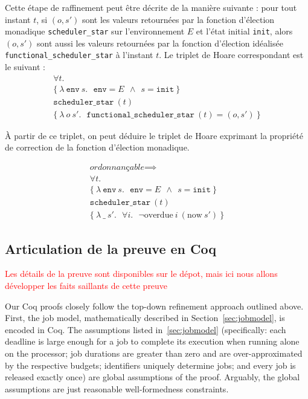 	Cette étape de raffinement peut être décrite de la manière suivante : pour tout instant $t$, si $(o, s')$ sont les valeurs retournées par la fonction d'élection monadique \texttt{scheduler\_star} sur l'environnement $E$ et l'état initial \texttt{init}, alors $(o, s')$ sont aussi les valeurs retournées par la fonction d'élection idéalisée \texttt{functional\_scheduler\_star} à l'instant $t$. Le triplet de Hoare correspondant est le suivant :
	\begin{gather*}
		\forall t.\\
		\{
		~\lambda~\mathtt{env}~s.~~~\mathtt{env} = E~~\land~~s = \mathtt{init}~
		\}\\
		\texttt{scheduler\_star}~(t)\\
		\{
		~\lambda~o~s'.~~~\texttt{functional\_scheduler\_star}~(t) = (o,s')~
		\}
	\end{gather*}

	À partir de ce triplet, on peut déduire le triplet de Hoare exprimant la propriété de correction de la fonction d'élection monadique.

	\begin{gather*}
		\textit{ordonnançable} \implies\\
		\forall t.\\
		\{
		~\lambda~\mathtt{env}~s.~~~\mathtt{env} = E~~\land~~s = \mathtt{init}~
		\}\\
		\texttt{scheduler\_star}~(t)\\
		\{
		~\lambda~\_~s'.~~~\forall i.~~~\neg \text{overdue}~i~(\text{now}~s') ~
		\}
	\end{gather*}


	\subsection{Articulation de la preuve en Coq}

	\textcolor{red}{Les détails de la preuve sont disponibles sur le dépot, mais ici nous allons développer les faits saillants de cette preuve}

	Our Coq proofs closely follow the top-down refinement approach outlined above. First, the job model, mathematically described in Section~\ref{sec:jobmodel}, is encoded in Coq. The assumptions listed in~\ref{sec:jobmodel} (specifically: each deadline is large enough for a job to complete its execution when running alone on the processor; job durations are greater than zero and are over-approximated by the respective budgets; identifiers uniquely determine jobs; and every job is released exactly once) are global assumptions of the proof. Arguably, the global assumptions are just reasonable well-formedness constraints.



